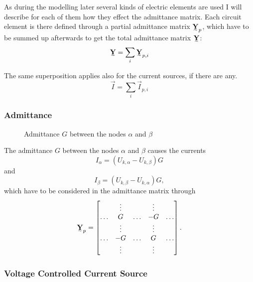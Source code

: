 As during the modelling later several kinds of electric elements are used I will describe for each of them how they effect the admittance matrix. Each circuit element is there defined through a partial admittance matrix $\mat Y_p$, which have to be summed up afterwards to get the total admittance matrix $\mat Y$:
\begin{equation}
	\mat Y = \sum_i \mat Y_{p,i}
\end{equation}

The same superposition applies also for the current sources, if there are any.
\begin{equation}
	\vec I = \sum_i \vec I_{p,i}
\end{equation}

\subsubsection{Admittance}

\begin{figure}
	\centering
	
	\caption{Admittance $G$ between the nodes $\alpha$ and $\beta$}
	\label{fig:admittance}
\end{figure}

The admittance $G$ between the nodes $\alpha$ and $\beta$  causes the currents
\begin{equation}
	I_\alpha = (U_{k,\alpha} - U_{k,\beta}) G
\end{equation}
and
\begin{equation}
	I_\beta = (U_{k,\beta} - U_{k,\alpha}) G,
\end{equation}
which have to be considered in the admittance matrix through
\begin{equation}
	\mat Y_{p} = 
	\begin{bmatrix}
	 		& \vdots 	& 			& \vdots 	& 			\\
	 \hdots & G			& \hdots	& -G		& \hdots 	\\
	 		& \vdots 	& 			& \vdots 	& 			\\
	 \hdots & -G		& \hdots	& G			& \hdots 	\\
	 		& \vdots 	& 			& \vdots 	& 			
	\end{bmatrix}.
\end{equation}

\subsubsection{Voltage Controlled Current Source}

